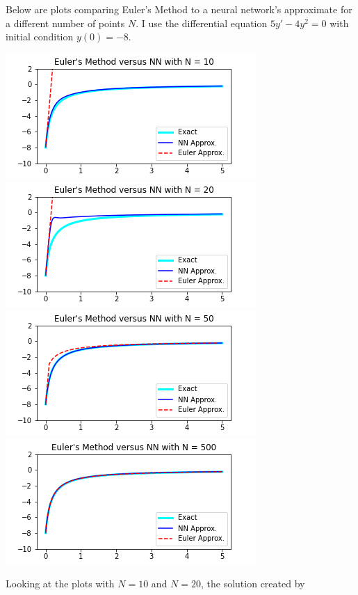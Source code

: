 \documentclass[12pt]{article}
\begin{document}
\begin{description}
    Below are plots comparing Euler's Method to a neural network's approximate
    for a different number of points $N$. I use the differential equation $5y'
    - 4y^2 = 0$ with initial condition $y(0) = -8$. \\
    \begin{minipage}{\linewidth}
        \centering
        \includegraphics[scale=.5]{images/euler10.png}
        \includegraphics[scale=.5]{images/euler20.png}
        \includegraphics[scale=.5]{images/euler50.png}
        \includegraphics[scale=.5]{images/euler500.png}
    \end{minipage}
    Looking at the plots with $N = 10$ and $N = 20$, the solution created by

\end{description}
\end{document}
